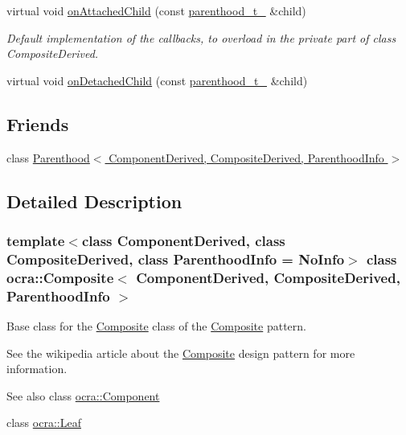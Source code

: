 {\bf }\par
\begin{DoxyCompactItemize}
\item 
virtual void \hyperlink{classocra_1_1Composite_a9937c32827a7c7f3caede800fbe7741e}{on\+Attached\+Child} (const \hyperlink{classocra_1_1Parenthood}{parenthood\+\_\+t\+\_\+} \&child)
\begin{DoxyCompactList}\small\item\em Default implementation of the callbacks, to overload in the private part of class Composite\+Derived. \end{DoxyCompactList}\item 
virtual void \hyperlink{classocra_1_1Composite_a94ec703ff5bf3c94f522648f117c8221}{on\+Detached\+Child} (const \hyperlink{classocra_1_1Parenthood}{parenthood\+\_\+t\+\_\+} \&child)
\end{DoxyCompactItemize}

\subsection*{Friends}
\begin{DoxyCompactItemize}
\item 
class \hyperlink{classocra_1_1Composite_ad71e675afae5fce6263d2d784cd3907a}{Parenthood$<$ Component\+Derived, Composite\+Derived, Parenthood\+Info $>$}
\end{DoxyCompactItemize}


\subsection{Detailed Description}
\subsubsection*{template$<$class Component\+Derived, class Composite\+Derived, class Parenthood\+Info = No\+Info$>$\newline
class ocra\+::\+Composite$<$ Component\+Derived, Composite\+Derived, Parenthood\+Info $>$}

Base class for the \hyperlink{classocra_1_1Composite}{Composite} class of the \hyperlink{classocra_1_1Composite}{Composite} pattern. 

See the wikipedia article about the \hyperlink{classocra_1_1Composite}{Composite} design pattern for more information. \begin{DoxySeeAlso}{See also}
class \hyperlink{classocra_1_1Component}{ocra\+::\+Component} 

class \hyperlink{classocra_1_1Leaf}{ocra\+::\+Leaf}
\end{DoxySeeAlso}

